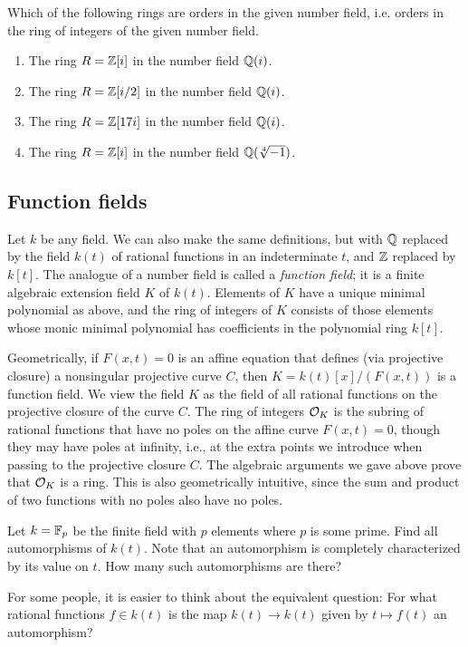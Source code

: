 \begin{exercise}
	Which of the following rings are orders in the given
	number field, i.e. orders in the ring of integers of the
	given number field.
	\begin{enumerate}[label=(\emph{\alph*})]
		\item The ring $R = \mathbb{Z}[i]$ in the number field $\mathbb{Q}(i)$.
		\item The ring $R = \mathbb{Z}[i/2]$ in the number field $\mathbb{Q}(i)$.
		\item The ring $R = \mathbb{Z}[17i]$ in the number field $\mathbb{Q}(i)$.
		\item The ring $R = \mathbb{Z}[i]$ in the number field $\mathbb{Q}(\sqrt[4]{-1})$.
	\end{enumerate}
\end{exercise}

\subsection{Function fields}
Let $k$ be any field.  We can also make the same definitions, but with $\mathbb{Q}$
replaced by the field $k(t)$ of rational functions in an indeterminate
$t$, and $\mathbb{Z}$ replaced by $k[t]$.
The analogue of a number field is called a {\em function field}; it is
a finite algebraic extension field $K$ of $k(t)$.  Elements of $K$
have a unique minimal polynomial as above, and the ring of integers of
$K$ consists of those elements whose monic minimal polynomial has
coefficients in the polynomial ring $k[t]$.

Geometrically, if $F(x,t)=0$ is an affine equation that defines (via
projective closure) a nonsingular projective curve $C$, then
$K=k(t)[x]/(F(x,t))$ is a function field.  We view the field $K$ as
the field of all rational functions on the projective closure of the
curve $C$.  The ring of integers $\mathcal{O}_K$ is the subring of rational
functions that have no poles on the affine curve $F(x,t)=0$, though
they may have poles at infinity, i.e., at the extra points we
introduce when passing to the projective closure $C$.  The algebraic
arguments we gave above prove that $\mathcal{O}_K$ is a ring.  This is also
geometrically intuitive, since the sum and product of two functions
with no poles also have no poles.

\begin{exercise}
	Let $k = \mathbb{F}_p$ be the finite field with $p$ elements where $p$ is some prime. Find all automorphisms of $k(t)$. Note that an automorphism is completely characterized by its value on $t$. How many such automorphisms are there?

	\begin{hint}
		For some people, it is easier to think about the equivalent question: For what rational functions $f\in k(t)$ is the map $k(t)\to k(t)$ given by $t\mapsto f(t)$ an automorphism?
	\end{hint}
\end{exercise}

